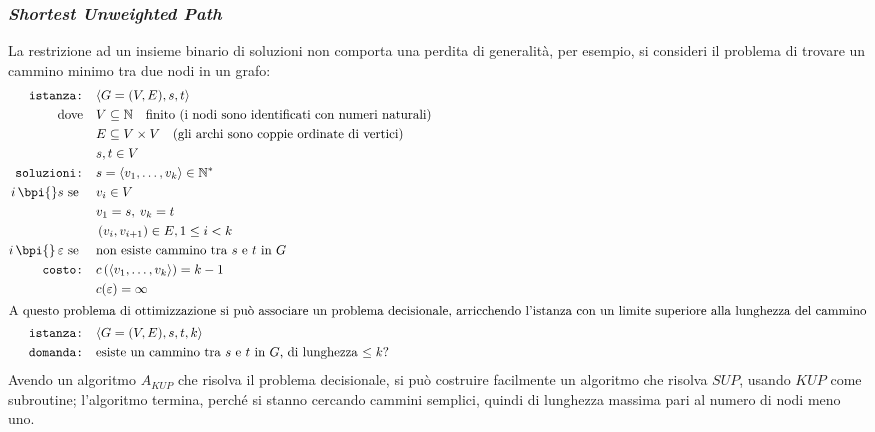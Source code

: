 \subsubsection{\emph{Shortest Unweighted Path}}
La restrizione ad un insieme binario di soluzioni non comporta una perdita di generalità, per esempio, si consideri il problema di trovare un cammino minimo tra due nodi in un grafo:
\begin{align*}
    \texttt{istanza:} \quad & \langle G=(V,E), s, t \rangle \\
    \text{dove} \quad & V \subseteq \mathbb{N} \quad \text{finito (i nodi sono identificati con numeri naturali)} \\
    & E \subseteq V \times V \quad \text{(gli archi sono coppie ordinate di vertici)} \\
    & s, t \in V \\
    \texttt{soluzioni:} \quad & s=\langle v_1, \dots, v_k \rangle \in \mathbb{N}^* \\
    i \, \bpi{} s \text{ se } \quad & 
    v_i \in V \\
    & v_1=s, \: v_k=t \\
    & \left( v_i, v_{i+1} \right) \in E, 1 \leq i < k \\
    i \, \bpi{} \, \varepsilon \text{ se } \quad & \text{non esiste cammino tra $s$ e $t$ in $G$} \\
    \texttt{costo:} \quad & c\left( \langle  v_1, \ldots, v_k  \rangle \right) = k - 1 \\
    & c( \varepsilon ) = \infty \\
    \intertext{A questo problema di ottimizzazione si può associare un problema decisionale, arricchendo l'istanza con un limite superiore alla lunghezza del cammino}
    \texttt{istanza:} \quad & \langle G=(V,E), s, t, k \rangle \\
    \texttt{domanda:} \quad & \text{esiste un cammino tra $s$ e $t$ in $G$, di lunghezza $\leq k$?} \\
\end{align*}
Avendo un algoritmo $A_{KUP}$ che risolva il problema decisionale, si può costruire facilmente un algoritmo che risolva $SUP$, usando $KUP$ come subroutine; l'algoritmo termina, perché si stanno cercando cammini semplici, quindi di lunghezza massima pari al numero di nodi meno uno.
